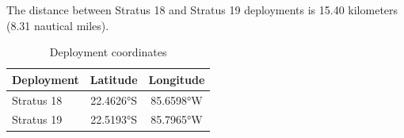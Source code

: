 
The distance between Stratus 18 and Stratus 19 deployments is 15.40 kilometers (8.31 nautical miles).

\begin{table}[ht]
\centering
\caption{Deployment coordinates}
\begin{tabular}{lcc}
\hline
\textbf{Deployment} & \textbf{Latitude} & \textbf{Longitude} \\
\hline
Stratus 18 & 22.4626°S & 85.6598°W \\
Stratus 19 & 22.5193°S & 85.7965°W \\
\hline
\end{tabular}
\end{table}
